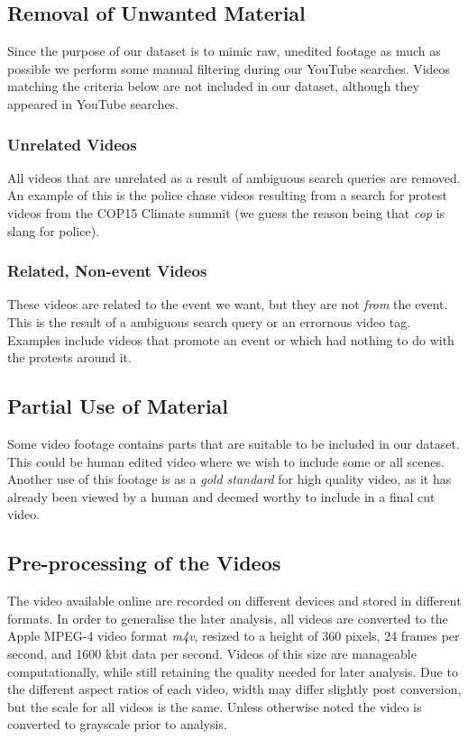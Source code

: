 \subsection{Removal of Unwanted Material}
%
Since the purpose of our dataset is to mimic raw, unedited footage as much as possible we perform some manual filtering during our YouTube searches. Videos matching the criteria below are not included in our dataset, although they appeared in YouTube searches.
%
\subsubsection{Unrelated Videos}
%
All videos that are unrelated as a result of ambiguous search queries are removed. An example of this is the police chase videos resulting from a search for protest videos from the COP15 Climate summit (we guess the reason being that \emph{cop} is slang for police).
%
\subsubsection{Related, Non-event Videos}
%
These videos are related to the event we want, but they are not \emph{from} the event. This is the result of a ambiguous search query or an errornous video tag. Examples include videos that promote an event or which had nothing to do with the protests around it.
%
\subsection{Partial Use of Material}
%
Some video footage contains parts that are suitable to be included in our dataset. This could be human edited video where we wish to include some or all scenes. Another use of this footage is as a \textit{gold standard} for high quality video, as it has already been viewed by a human and deemed worthy to include in a final cut video.
%
\subsection{Pre-processing of the Videos}
%
The video available online are recorded on different devices and stored in different formats. In order to generalise the later analysis, all videos are converted to the Apple MPEG-4 video format \textit{m4v}, resized to a height of 360 pixels, 24 frames per second, and 1600 kbit data per second. Videos of this size are manageable computationally, while still retaining the quality needed for later analysis. Due to the different aspect ratios of each video, width may differ slightly post conversion, but the scale for all videos is the same. Unless otherwise noted the video is converted to grayscale prior to analysis.
%
